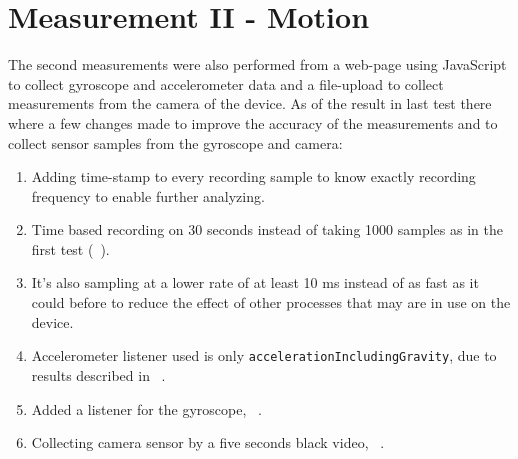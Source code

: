 \section{Measurement II - Motion}\label{sec:measurementII}
The second measurements were also performed from a web-page using JavaScript to collect gyroscope and accelerometer data and a file-upload to collect measurements from the camera of the device. As of the result in last test there where a few changes made to improve the accuracy of the measurements and to collect sensor samples from the gyroscope and camera:
\begin{enumerate}
  \item Adding time-stamp to every recording sample to know exactly recording frequency to enable further analyzing.
  \item Time based recording on 30 seconds instead of taking 1000 samples as in the first test (~).
  \item It's also sampling at a lower rate of at least 10 ms instead of as fast as it could before to reduce the effect of other processes that may are in use on the device.
  \item Accelerometer listener used is only \texttt{accelerationIncludingGravity}, due to results described in ~.
  \item Added a listener for the gyroscope, ~.
  \item Collecting camera sensor by a five seconds black video, ~.
\end{enumerate}

